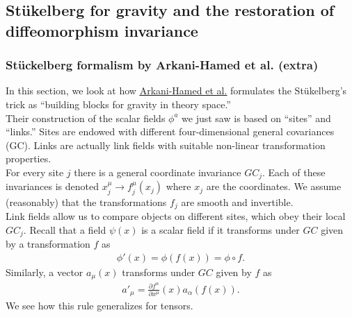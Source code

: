 \documentclass{book}
\theoremstyle{definition}
\newcommand{\p}{\partial}
\newcommand{\f}[2]{\frac{#1}{#2}}
\begin{document}
\subsection{St\"{u}kelberg for gravity and the restoration of diffeomorphism invariance}




\subsubsection{St\"{u}ckelberg formalism by Arkani-Hamed et al. (extra)}


In this section, we look at how \href{https://arxiv.org/pdf/hep-th/0210184.pdf}{\underline{Arkani-Hamed et al.}} formulates the St\"{u}kelberg's trick as ``building blocks for gravity in theory space.''\\

Their construction of the scalar fields $\phi^a$ we just saw is based on ``sites'' and ``links.'' Sites are endowed with different four-dimensional general covariances (GC). Links are actually link fields with suitable non-linear transformation properties. \\

For every site $j$ there is a general coordinate invariance $GC_j$. Each of these invariances is denoted $x^\mu_j \to f^\mu_j(x_j)$ where $x_j$ are the coordinates. We assume (reasonably) that the transformations $f_j$ are smooth and invertible.\\

Link fields allow us to compare objects on different sites, which obey their local $GC_j$. Recall that a field $\psi(x)$ is a scalar field if it transforms under $GC$ given by a transformation $f$ as
\begin{align}
\phi'(x) = \phi(f(x)) = \phi \circ f.
\end{align}
Similarly, a vector $a_\mu(x)$ transforms under $GC$ given by $f$ as
\begin{align}
a'_\mu = \f{\p f^\alpha}{\p x^\mu}(x)a_\alpha(f(x)).
\end{align}
We see how this rule generalizes for tensors. \\
\end{document}

